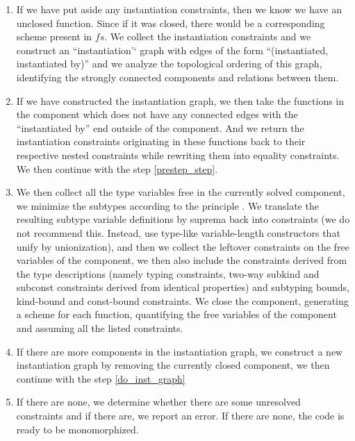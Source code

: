 \begin{defn}
\begin{enumerate}
        \item If we have put aside any instantiation constraints, then we know we have an unclosed function. Since if it was closed, there would be a corresponding scheme present in $fs$. We collect the instantiation constraints and we construct an ``instantiation'` graph with edges of the form ``(instantiated, instantiated by)'' and we analyze the topological ordering of this graph, identifying the strongly connected components and relations between them.

        \item If we have constructed the instantiation graph, we then take the functions in the component which does not have any connected edges with the ``instantiated by'' end outside of the component. And we return the instantiation constraints originating in these functions back to their respective nested constraints while rewriting them into equality constraints. We then continue with the step \ref{prestep_step}. \label{do_inst_graph}
        
        \item We then collect all the type variables free in the currently solved component, we minimize the subtypes according to the principle . We translate the resulting subtype variable definitions by suprema back into constraints (we do not recommend this. Instead, use type-like variable-length constructors that unify by unionization), and then we collect the leftover constraints on the free variables of the component, we then also include the constraints derived from the type descriptions (namely typing constraints, two-way subkind and subconst constraints derived from identical properties) and subtyping bounds, kind-bound and const-bound constraints. We close the component, generating a scheme for each function, quantifying the free variables of the component and assuming all the listed constraints.
        
        \item If there are more components in the instantiation graph, we construct a new instantiation graph by removing the currently closed component, we then continue with the step \ref{do_inst_graph}
        
        \item If there are none, we determine whether there are some unresolved constraints and if there are, we report an error. If there are none, the code is ready to be monomorphized.
    \end{enumerate}


\end{defn}
